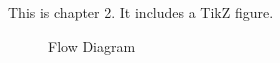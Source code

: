 \documentclass[../report.tex]{subfiles}
\begin{document}
This is chapter 2. It includes a TikZ figure.
\begin{figure}
    \caption{Flow Diagram}
\end{figure}
\end{document}
